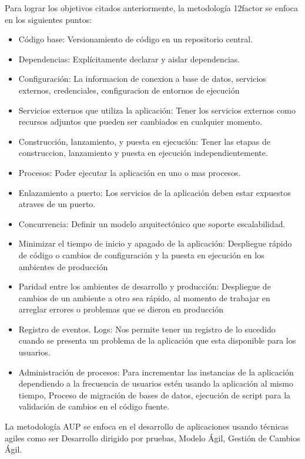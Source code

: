 \noindent Para lograr los objetivos citados anteriormente, la metodología 12factor se enfoca en los siguientes puntos: 
\begin{itemize}
  \item Código base: Versionamiento de código en un repositorio central.
  \item Dependencias: Explícitamente declarar y aislar dependencias.
  \item Configuración: La informacion de conexion a base de datos, servicios externos, credenciales, configuracion de entornos de ejecución 
  \item Servicios externos que utiliza la aplicación: Tener los servicios externos como recursos adjuntos que pueden ser cambiados en cualquier momento.
  \item Construcción, lanzamiento, y puesta en ejecución: Tener las etapas de construccion, lanzamiento y puesta en ejecución independientemente. 
  \item Procesos: Poder ejecutar la aplicación en uno o mas procesos. 
  \item Enlazamiento a puerto: Los servicios de la aplicación deben estar expuestos atraves de un puerto.
  \item Concurrencia: Definir un modelo arquitectónico que soporte escalabilidad.
  \item Minimizar el tiempo de inicio y apagado de la aplicación: Despliegue rápido de código o cambios de configuración y la puesta en ejecución en los ambientes de producción
  \item Paridad entre los ambientes de desarrollo y producción: Despliegue de cambios de un ambiente a otro sea rápido, al momento de trabajar en arreglar errores o problemas que se dieron en producción
  \item Registro de eventos. Logs: Nos permite tener un registro de lo sucedido cuando se presenta un problema de la aplicación que esta disponible para los usuarios.
  \item Administración de procesos: Para incrementar las instancias de la aplicación dependiendo a la frecuencia de usuarios estén usando la aplicación al mismo tiempo, Proceso de migración de bases de datos, ejecución de script para la validación de cambios en el código fuente.
\end{itemize}

\noindent La metodología AUP se enfoca en el desarrollo de aplicaciones usando técnicas agiles como ser Desarrollo dirigido por pruebas,  Modelo Ágil, Gestión de Cambios Ágil.

